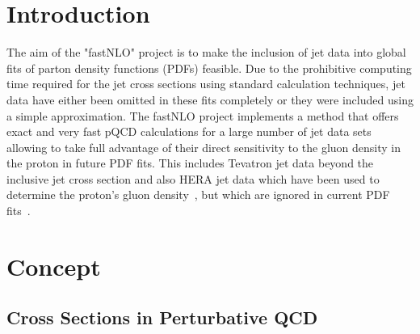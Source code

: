 \section{Introduction}



The aim of the "fastNLO" project is to make the inclusion of jet data
into global fits of parton density functions (PDFs) feasible. 
Due to the prohibitive computing time required for the jet cross sections 
using standard calculation techniques,
jet data have either been omitted in these fits completely 
or they were included using a simple approximation.
%
The fastNLO project implements a method that offers exact and 
very fast pQCD calculations
for a large number of jet data sets 
allowing to take full advantage of their direct sensitivity 
to the gluon density in the proton in future PDF fits.
%
This includes Tevatron jet data beyond
the inclusive jet cross section and also
HERA jet data which have %
been used to determine the proton's gluon
density~\cite{Adloff:2000tq,Chekanov:2001bw,Chekanov:2002be,Chekanov:2005nn},
but which are ignored in current 
PDF fits~\cite{Alekhin:2005gq,Martin:2004ir,Pumplin:2002vw}.



\section{Concept}

\subsection{Cross Sections in Perturbative QCD}

